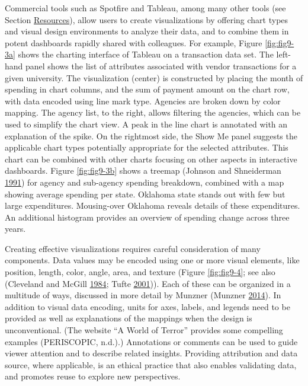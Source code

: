 \documentclass[]{krantz}
\begin{document}
Commercial tools such as Spotfire and Tableau, among many other tools
(see Section \protect\hyperlink{sec:mylabel4}{Resources}), allow users
to create visualizations by offering chart types and visual design
environments to analyze their data, and to combine them in potent
dashboards rapidly shared with colleagues. For example, Figure
\ref{fig:fig9-3a} shows the charting interface of Tableau on a
transaction data set. The left-hand panel shows the list of attributes
associated with vendor transactions for a given university. The
visualization (center) is constructed by placing the month of spending
in chart columns, and the sum of payment amount on the chart row, with
data encoded using line mark type. Agencies are broken down by color
mapping. The agency list, to the right, allows filtering the agencies,
which can be used to simplify the chart view. A peak in the line chart
is annotated with an explanation of the spike. On the rightmost side,
the Show Me panel suggests the applicable chart types potentially
appropriate for the selected attributes. This chart can be combined with
other charts focusing on other aspects in interactive dashboards. Figure
\ref{fig:fig9-3b} shows a treemap (Johnson and Shneiderman
\protect\hyperlink{ref-johnson1991tree}{1991}) for agency and sub-agency
spending breakdown, combined with a map showing average spending per
state. Oklahoma state stands out with few but large expenditures.
Mousing-over Oklahoma reveals details of these expenditures. An
additional histogram provides an overview of spending change across
three years.

Creating effective visualizations requires careful consideration of many
components. Data values may be encoded using one or more visual
elements, like position, length, color, angle, area, and texture (Figure
\ref{fig:fig9-4}; see also (Cleveland and McGill
\protect\hyperlink{ref-cleveland1984graphical}{1984}; Tufte
\protect\hyperlink{ref-edward2001visual}{2001})). Each of these can be
organized in a multitude of ways, discussed in more detail by Munzner
(Munzner \protect\hyperlink{ref-munzner2014visualization}{2014}). In
addition to visual data encoding, units for axes, labels, and legends
need to be provided as well as explanations of the mappings when the
design is unconventional. (The website ``A World of Terror'' provides
some compelling examples (PERISCOPIC, n.d.).) Annotations or comments
can be used to guide viewer attention and to describe related insights.
Providing attribution and data source, where applicable, is an ethical
practice that also enables validating data, and promotes reuse to
explore new perspectives.
\end{document}
